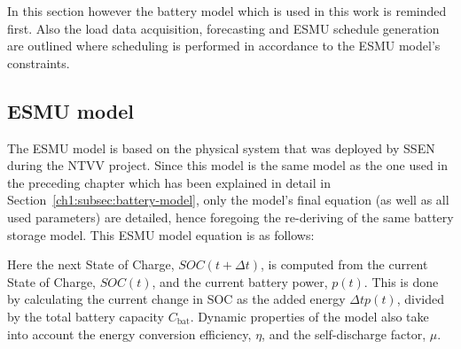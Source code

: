 In this section however the battery model which is used in this work is reminded first.
Also the load data acquisition, forecasting and ESMU schedule generation are outlined where scheduling is performed in accordance to the ESMU model's constraints.

\subsection{ESMU model}
\label{ch2:subsec:esmu-model}

\nomenclature[J]{$\mu$}{Self-discharge losses of battery, where $\mu \in (0, 1]$}
\nomenclature[J]{$\eta$}{Round-trip efficiency of power electronics, where $\eta \in (0, 1]$}

The ESMU model is based on the physical system that was deployed by SSEN during the NTVV project.
Since this model is the same model as the one used in the preceding chapter which has been explained in detail in Section~\ref{ch1:subsec:battery-model}, only the model's final equation (as well as all used parameters) are detailed, hence foregoing the re-deriving of the same battery storage model.
This ESMU model equation is as follows:



Here the next State of Charge, $SOC(t+\Delta t)$, is computed from the current State of Charge, $SOC(t)$, and the current battery power, $p(t)$.
This is done by calculating the current change in SOC as the added energy $\Delta t p(t)$, divided by the total battery capacity $C_\text{bat}$.
Dynamic properties of the model also take into account the energy conversion efficiency, $\eta$, and the self-discharge factor, $\mu$.

